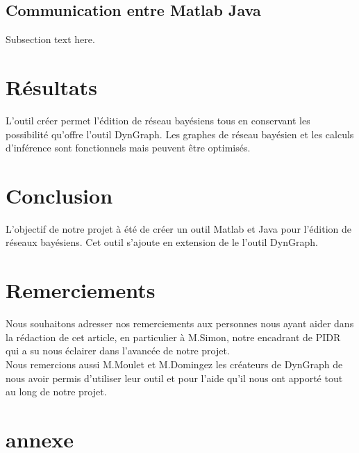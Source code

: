 \documentclass[conference]{IEEEtran}
\begin{document}
\subsection{Communication entre Matlab Java}
Subsection text here.


\section{Résultats}
	L'outil créer permet l'édition de réseau bayésiens tous en conservant les possibilité qu'offre l'outil DynGraph. Les graphes de réseau bayésien et les calculs d'inférence sont fonctionnels mais peuvent être optimisés. 

\section{Conclusion}

	L'objectif de notre projet à été de créer un outil Matlab et Java pour l'édition de réseaux bayésiens. Cet outil s'ajoute en extension de le l'outil DynGraph.\\
	

\section{Remerciements}
Nous souhaitons adresser nos remerciements aux personnes nous ayant aider dans la rédaction
de cet article, en particulier à M.Simon, notre encadrant de PIDR qui a su nous éclairer dans l'avancée de notre projet. \\
Nous remercions aussi M.Moulet et M.Domingez les créateurs de DynGraph de nous avoir permis d'utiliser leur outil et pour  l'aide qu'il nous ont apporté tout au long de notre projet. 

\section{annexe}



%
%
%



\cite{Matlab}
\cite{jayes}




\end{document}

